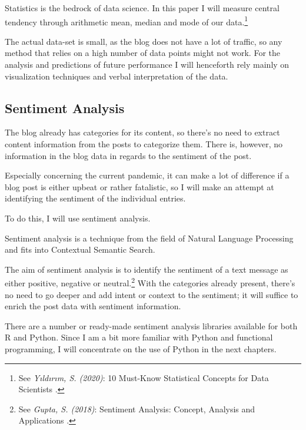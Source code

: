 Statistics is the bedrock of data science. In this paper I will measure central tendency through arithmetic mean, median and mode of our data.\footnote{See \textit{Yıldırım, S. (2020)}: 10 Must-Know Statistical Concepts for Data Scientists .\cite{bedrockScience}}

The actual data-set is small, as the blog does not have a lot of traffic, so any method that relies on a high number of data points might not work. For the analysis and predictions of future performance I will henceforth rely mainly on visualization techniques and verbal interpretation of the data.

\subsection{Sentiment Analysis}

The blog already has categories for its content, so there's no need to extract content information from the posts to categorize them. There is, however, no information in the blog data in regards to the sentiment of the post.

Especially concerning the current pandemic, it can make a lot of difference if a blog post is either upbeat or rather fatalistic, so I will make an attempt at identifying the sentiment of the individual entries.

To do this, I will use sentiment analysis. 

Sentiment analysis is a technique from the field of Natural Language Processing and fits into Contextual Semantic Search. 

The aim of sentiment analysis is to identify the sentiment of a text message as either positive, negative or neutral.\footnote{See \textit{Gupta, S. (2018)}: Sentiment Analysis: Concept, Analysis and Applications .\cite{sentimentAnalysis}} With the categories already present, there's no need to go deeper and add intent or context to the sentiment; it will suffice to enrich the post data with sentiment information.

There are a number or ready-made sentiment analysis libraries available for both R and Python. Since I am a bit more familiar with Python and functional programming, I will concentrate on the use of Python in the next chapters.
